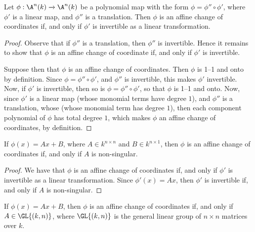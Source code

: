 \begin{proposition}\label{proposition_2.2.2}
  Let $\phi:\A^n(k) \xrightarrow{} \A^n(k)$ be a polynomial map with the form
  $\phi=\phi'' \circ \phi'$, where $\phi'$ is a linear map, and  $\phi''$ is a
  translation. Then $\phi$ is an affine change of coordinates if, and only if
  $\phi'$ is invertible as a linear transformation.
\end{proposition}
\begin{proof}
  Observe that if $\phi''$ is a translation, then $\phi''$ is invertible. Hence
  it remains to show that $\phi$ is an affine change of coordinate if, and only
  if $\phi'$ is invertible.

  Suppose then that $\phi$ is an affine change of coordinates. Then  $\phi$ is
  1--1 and onto by definition. Since $\phi=\phi'' \circ \phi'$, and $\phi''$ is
  invertible, this makes $\phi'$ invertible. Now, if $\phi'$ is invertible, then
  so is $\phi=\phi'' \circ \phi'$, so that $\phi$ is 1--1 and onto. Now, since
  $\phi'$ is a linear map  (whose monomial terms have degree $1$), and $\phi''$
  is a translation, whose (whose monomial term has degree $1$), then each
  component polynomial of $\phi$ has total degree $1$, which makes $\phi$ an
  affine change of coordinates, by definition.
\end{proof}
\begin{corollary}
  If $\phi(x)=Ax+B$, where $A \in k^{n \times n}$ and $B \in k^{n \times 1}$,
  then $\phi$ is an affine change of coordinates if, and only if $A$ is
  non-singular.
\end{corollary}
\begin{proof}
  We have that $\phi$ is an affine change of coordinates if, and only if $\phi'$
  is invertible as a linear transformation. Since $\phi'(x)=Ax$, then $\phi'$ is
  invertible if, and only if $A$ is non-singular.
\end{proof}
\begin{corollary}
  If $\phi(x)=Ax+B$, then $\phi$ is an affine change of coordinates if, and only
  if $A \in \GL{(k,n)}$, where $\GL{(k,n)}$ is the general linear group of $n
  \times n$ matrices over $k$.
\end{corollary}

